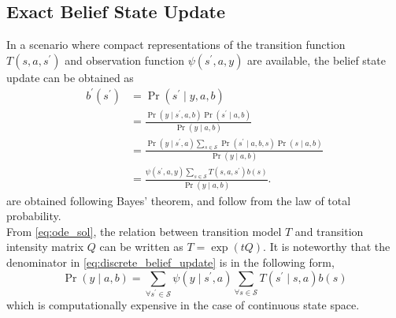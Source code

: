 \subsection{Exact Belief State Update}
\label{sec:exact_update}
In a scenario where compact representations of the transition function $ T(s, a, s^{\prime})$  and observation function $ \psi(s^{\prime}, a, y) $ are available, the belief state update can be obtained as \cite{KAELBLING199899}
\begin{align}
b^{\prime}\left(s^{\prime}\right) &=\operatorname{Pr}\left(s^{\prime} \mid y, a, b\right) \label{eq:bu1}\\
&=\frac{\operatorname{Pr}\left(y \mid s^{\prime}, a, b\right) \operatorname{Pr}\left(s^{\prime} \mid a, b\right)}{\operatorname{Pr}(y \mid a, b)} \label{eq:bu2}\\
&=\frac{\operatorname{Pr}\left(y \mid s^{\prime}, a\right) \sum_{s \in \mathcal{S}} \operatorname{Pr}\left(s^{\prime} \mid a, b, s\right) \operatorname{Pr}(s \mid a, b)}{\operatorname{Pr}(y \mid a, b)}  \label{eq:bu3}\\
&=\frac{\psi\left(s^{\prime}, a, y\right) \sum_{s \in \mathcal{S}} T\left(s,a, s^{\prime}\right) b(s)}{\operatorname{Pr}(y \mid a, b)}.
\label{eq:discrete_belief_update}
\end{align}
 are obtained following Bayes' theorem, and  follow from the law of total probability. \\
From \autoref{eq:ode_sol}, the relation between transition model $ T $ and transition intensity matrix $ Q $ can be written as $ T = \exp(tQ) $.
It is noteworthy that the denominator in \autoref{eq:discrete_belief_update} is in the following form, 
\begin{equation}
\operatorname{Pr}(y \mid a, b) = \sum_{\forall s^{\prime} \in \mathcal{S}} \psi(y \mid s^{\prime}, a) \sum_{\forall s \in \mathcal{S}} T(s^{\prime}\mid s,a) b(s)
\label{eq:nasty_denom}
\end{equation}
which is computationally expensive in the case of continuous state space.
